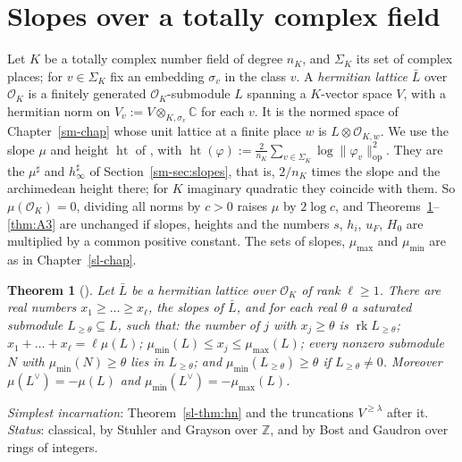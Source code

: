 \documentclass[reqno]{amsart}
\newcounter{chap}
\theoremstyle{definition}
\theoremstyle{plain}
\newtheorem{theorem}{Theorem}[section]
\newcommand{\Z}{\mathbb{Z}}
\newcommand{\C}{\mathbb{C}}
\newcommand{\Oc}{\mathcal{O}}
\newcommand{\mumax}{\mu_{\max}}
\newcommand{\mumin}{\mu_{\min}}
\newcommand{\rk}{\operatorname{rk}}
\newcommand{\hgt}{\operatorname{ht}}
\begin{document}
\section{Slopes over a totally complex field}\label{sec:slopes}

Let \(K\) be a totally complex number field of degree \(n_K\), and \(\Sigma_K\) its set of complex places; for \(v \in \Sigma_K\) fix an embedding \(\sigma_v\) in the class \(v\).  A \emph{hermitian lattice} \(\bar L\) over \(\Oc_K\) is a finitely generated \(\Oc_K\)-submodule \(L\) spanning a \(K\)-vector space \(V\), with a hermitian norm on \(V_v := V \otimes_{K,\sigma_v} \C\) for each \(v\).  It is the normed space of Chapter~\ref{sm-chap} whose unit lattice at a finite place \(w\) is \(L \otimes \Oc_{K,w}\).  We use the slope \(\mu\) and height \(\hgt\) of \cite[(13.1), (13.2)]{Adr}, with \(\hgt(\varphi) := \frac{2}{n_K}\sum_{v \in \Sigma_K} \log\lVert\varphi_v\rVert_{\mathrm{op}}^2\).  They are the \(\mu^\sharp\) and \(h_\infty^\sharp\) of Section~\ref{sm-sec:slopes}, that is, \(2/n_K\) times the slope and the archimedean height there; for \(K\) imaginary quadratic they coincide with them.  So \(\mu(\Oc_K) = 0\), dividing all norms by \(c > 0\) raises \(\mu\) by \(2\log c\), and Theorems~\ref{thm:hn}--\ref{thm:A3} are unchanged if slopes, heights and the numbers \(s\), \(h_i\), \(u_F\), \(H_0\) are multiplied by a common positive constant.  The sets of slopes, \(\mumax\) and \(\mumin\) are as in Chapter~\ref{sl-chap}.

\begin{theorem}[{\cite[Prop.~13.1]{Adr}}]\label{thm:hn}
Let \(\bar L\) be a hermitian lattice over \(\Oc_K\) of rank \(\ell \ge 1\).  There are real numbers \(x_1 \ge \dots \ge x_\ell\), the slopes of \(\bar L\), and for each real \(\theta\) a saturated submodule \(L_{\ge\theta} \subseteq L\), such that: the number of \(j\) with \(x_j \ge \theta\) is \(\rk L_{\ge\theta}\); \(x_1 + \dots + x_\ell = \ell\mu(L)\); \(\mumin(L) \le x_j \le \mumax(L)\); every nonzero submodule \(N\) with \(\mumin(N) \ge \theta\) lies in \(L_{\ge\theta}\); and \(\mumin(L_{\ge\theta}) \ge \theta\) if \(L_{\ge\theta} \ne 0\).  Moreover \(\mu(L^\vee) = -\mu(L)\) and \(\mumin(L^\vee) = -\mumax(L)\).
\end{theorem}

\emph{Simplest incarnation}: Theorem~\ref{sl-thm:hn} and the truncations \(V^{\ge\lambda}\) after it.  \emph{Status}: classical, by Stuhler \cite{St} and Grayson \cite{Gr} over \(\Z\), and by Bost \cite{Bo1} and Gaudron \cite{Ga} over rings of integers.
\end{document}
